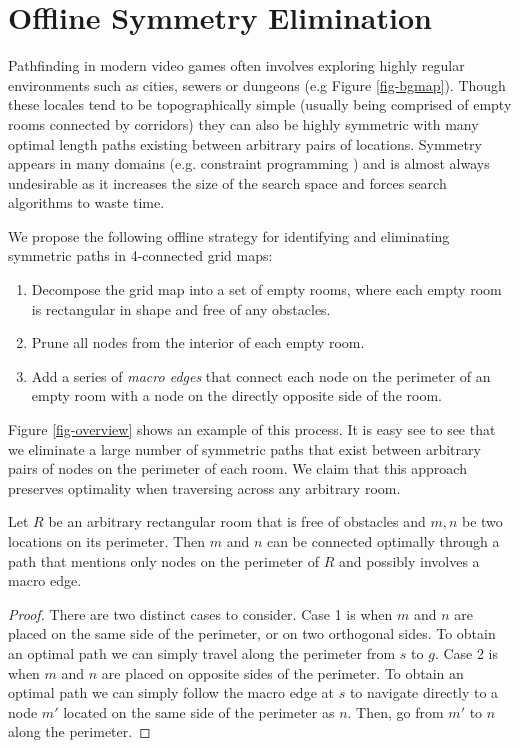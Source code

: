 \section{Offline Symmetry Elimination}
\label{algorithm}
Pathfinding in modern video games often involves exploring highly regular 
environments such as cities, sewers or dungeons (e.g Figure \ref{fig-bgmap}).
Though these locales tend to be topographically simple (usually being comprised
of empty rooms connected by corridors) they can also be highly symmetric 
with many optimal length paths existing between arbitrary pairs of locations.
Symmetry appears in many domains (e.g. constraint programming \cite{walsh07}) and is 
almost always undesirable as it increases the size of the search space
and forces search algorithms to waste time.
\par
We propose the following offline strategy for identifying and eliminating symmetric paths in 
4-connected grid maps:
\begin{enumerate}
\item{Decompose the grid map into a set of empty rooms, where each empty room is 
rectangular in shape and free of any obstacles.}
\item{Prune all nodes from the interior of each empty room.}
\item{Add a series of \emph{macro edges} that connect each node on the perimeter of an empty room
with a node on the directly opposite side of the room.}
\end{enumerate}
Figure \ref{fig-overview} shows an example of this process.
It is easy see to see that we eliminate a large number of symmetric paths
that exist between arbitrary pairs of nodes on the perimeter of each room.
We claim that this approach preserves optimality when traversing across any arbitrary room.

\begin{lemma}
\label{thm-roomtraversal}
Let $R$ be an arbitrary rectangular room that is free of obstacles
and $m, n$ be two locations on its perimeter.
Then $m$ and $n$ can be connected optimally through a path that
mentions only nodes on the perimeter of $R$ and possibly involves
a macro edge.
\end{lemma}
\begin{proof}
\par
There are two distinct cases to consider.
Case 1 is when $m$ and $n$ are placed on the same side of the perimeter, or
on two orthogonal sides. 
To obtain an optimal path we can simply travel along the perimeter from $s$ to $g$.
Case 2 is when $m$ and $n$ are placed on opposite sides of the perimeter.
To obtain an optimal path we can simply follow the macro edge at $s$ 
to navigate directly to a node $m'$ located on
the same side of the perimeter as $n$. Then, go from $m'$ to $n$ along the perimeter.
\end{proof}

